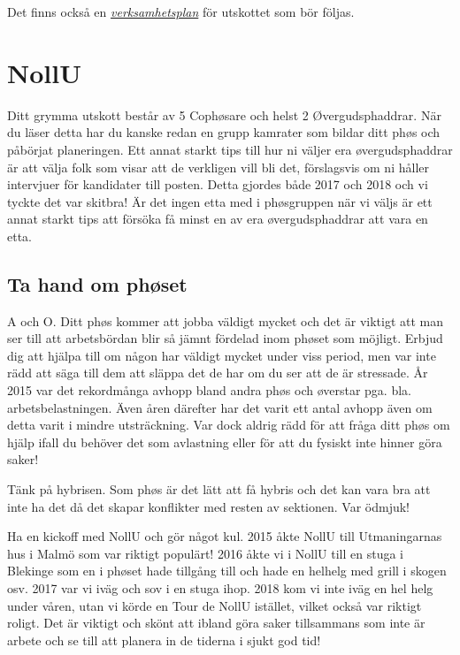 \documentclass[10pt]{article}
\begin{document}
    Det finns också en \href{https://eee.esek.se/files/styrdokument/verksamhetsplaner/vp-2018.pdf}{\textit{verksamhetsplan}} för utskottet som bör följas.
    
    \section{NollU}
    Ditt grymma utskott består av 5 Cophøsare och helst 2 Øvergudsphaddrar. När du läser detta har du kanske redan en grupp kamrater som bildar ditt phøs och påbörjat planeringen. Ett annat starkt tips till hur ni väljer era øvergudsphaddrar är att välja folk som visar att de verkligen vill bli det, förslagsvis om ni håller intervjuer för kandidater till posten. Detta gjordes både 2017 och 2018 och vi tyckte det var skitbra! Är det ingen etta med i phøsgruppen när vi väljs är ett annat starkt tips att försöka få minst en av era øvergudsphaddrar att vara en etta.
    
    \subsection{Ta hand om phøset}
    A och O. Ditt phøs kommer att jobba väldigt mycket och det är viktigt att man ser till att arbetsbördan blir så jämnt fördelad inom phøset som möjligt. Erbjud dig att hjälpa till om någon har väldigt mycket under viss period, men var inte rädd att säga till dem att släppa det de har om du ser att de är stressade. År 2015 var det rekordmånga avhopp bland andra phøs och øverstar pga. bla. arbetsbelastningen. Även åren därefter har det varit ett antal avhopp även om detta varit i mindre utsträckning. Var dock aldrig rädd för att fråga ditt phøs om hjälp ifall du behöver det som avlastning eller för att du fysiskt inte hinner göra saker!

    Tänk på hybrisen. Som phøs är det lätt att få hybris och det kan vara bra att inte ha det då det skapar konflikter med resten av sektionen. Var ödmjuk!

    Ha en kickoff med NollU och gör något kul. 2015 åkte NollU till Utmaningarnas hus i Malmö som var riktigt populärt! 2016 åkte vi i NollU till en stuga i Blekinge som en i phøset hade tillgång till och hade en helhelg med grill i skogen osv. 2017 var vi iväg och sov i en stuga ihop. 2018 kom vi inte iväg en hel helg under våren, utan vi körde en Tour de NollU istället, vilket också var riktigt roligt. Det är viktigt och skönt att ibland göra saker tillsammans som inte är arbete och se till att planera in de tiderna i sjukt god tid!
    
\end{document}
